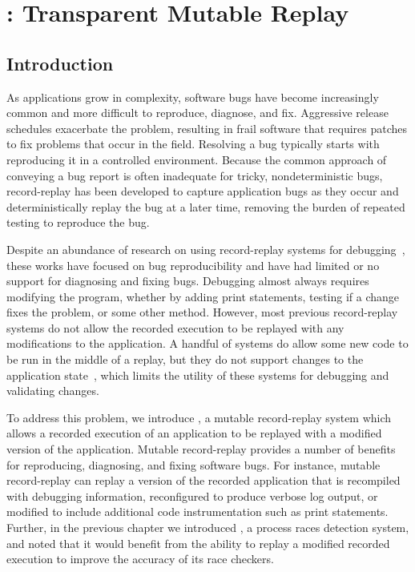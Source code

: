 \chapter{\dora: Transparent Mutable Replay}
\label{ch:dora}

\section{Introduction}

As applications grow in complexity, software bugs have become
increasingly common and more difficult to reproduce, diagnose, and fix.
Aggressive release schedules
exacerbate the problem, resulting in frail software that requires patches to
fix problems that occur in the field. Resolving a bug typically starts with
reproducing it in a controlled environment. Because the common approach of conveying a bug
report is often inadequate for tricky, nondeterministic bugs, record-replay has been developed to
capture application bugs as they occur and
deterministically replay the bug at a later time, removing the burden of
repeated testing to reproduce the bug.

Despite an abundance of research on using record-replay systems for 
debugging~\cite{idna:vee06,instant-replay,r2:osdi,odr:sosp09,pinsel:pldi07,pres:sosp09,jockey,srinivasan:flashback,subhraveti:sigmetrics11}, these works have
focused on bug reproducibility and have had limited or no support for diagnosing
and fixing bugs.
Debugging almost always requires modifying the program, whether by
adding print statements, testing if a change fixes the problem, or
some other method.
However, most previous record-replay systems do not allow the recorded execution
to be replayed with any modifications to the application.
A handful of systems do allow some new code to be run in the middle of a replay,
but they do not support changes to the application
state~\cite{intrusions:sosp05,decouple:usenix08},
which limits the utility of these systems for debugging and validating changes.

To address this problem, we introduce {\dora}, a mutable
record-replay system which allows a recorded execution of an
application to be replayed with a modified version
of the application. Mutable record-replay provides a
number of benefits for reproducing, diagnosing, and fixing software
bugs. For instance, mutable record-replay can replay a version
of the recorded application that is recompiled with debugging information,
reconfigured to produce verbose log output, or modified to include additional
code instrumentation such as print statements.
Further, in the previous chapter we introduced \racepro, a process races
detection system, and noted that it would benefit from the ability to replay a
modified recorded execution to improve the accuracy of its race checkers.

